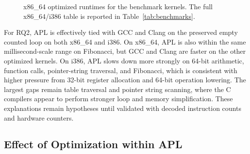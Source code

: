 \documentclass[10pt,twocolumn]{article}
\begin{document}
\begin{figure}[t]
\centering
{}
\caption{x86\_64 optimized runtimes for the benchmark kernels. The full x86\_64/i386 table is reported in Table~\ref{tab:benchmarks}.}
\label{fig:bench-optimized}
\end{figure}

\par For RQ2, APL is effectively tied with GCC and Clang on the preserved empty counted loop on both x86\_64 and i386. On x86\_64, APL is also within the same millisecond-scale range on Fibonacci, but GCC and Clang are faster on the other optimized kernels. On i386, APL slows down more strongly on 64-bit arithmetic, function calls, pointer-string traversal, and Fibonacci, which is consistent with higher pressure from 32-bit register allocation and 64-bit operation lowering. The largest gaps remain table traversal and pointer string scanning, where the C compilers appear to perform stronger loop and memory simplification. These explanations remain hypotheses until validated with decoded instruction counts and hardware counters.

\subsection{Effect of Optimization within APL}
\end{document}
